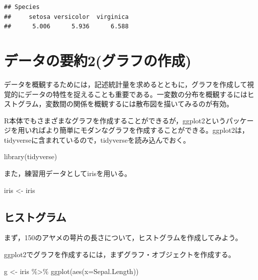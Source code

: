 \documentclass[
]{book}
\newenvironment{Shaded}{\begin{snugshade}}{\end{snugshade}}
\newcommand{\AttributeTok}[1]{\textcolor[rgb]{0.77,0.63,0.00}{#1}}
\newcommand{\FunctionTok}[1]{\textcolor[rgb]{0.00,0.00,0.00}{#1}}
\newcommand{\NormalTok}[1]{#1}
\newcommand{\OtherTok}[1]{\textcolor[rgb]{0.56,0.35,0.01}{#1}}
\newcommand{\SpecialCharTok}[1]{\textcolor[rgb]{0.00,0.00,0.00}{#1}}
\begin{document}
\begin{verbatim}
## Species
##     setosa versicolor  virginica 
##      5.006      5.936      6.588
\end{verbatim}

\hypertarget{ux30c7ux30fcux30bfux306eux8981ux7d042ux30b0ux30e9ux30d5ux306eux4f5cux6210}{%
\chapter{データの要約2(グラフの作成)}\label{ux30c7ux30fcux30bfux306eux8981ux7d042ux30b0ux30e9ux30d5ux306eux4f5cux6210}}

データを概観するためには，記述統計量を求めるとともに，グラフを作成して視覚的にデータの特性を捉えることも重要である。一変数の分布を概観するにはヒストグラム，変数間の関係を概観するには散布図を描いてみるのが有効。

R本体でもさまざまなグラフを作成することができるが，ggplot2というパッケージを用いればより簡単にモダンなグラフを作成することができる。ggplot2は，tidyverseに含まれているので，tidyverseを読み込んでおく。

\begin{Shaded}
\begin{Highlighting}[]
\FunctionTok{library}\NormalTok{(tidyverse)}
\end{Highlighting}
\end{Shaded}

また，練習用データとしてirisを用いる。

\begin{Shaded}
\begin{Highlighting}[]
\NormalTok{iris }\OtherTok{\textless{}{-}}\NormalTok{ iris}
\end{Highlighting}
\end{Shaded}

\hypertarget{ux30d2ux30b9ux30c8ux30b0ux30e9ux30e0}{%
\section{ヒストグラム}\label{ux30d2ux30b9ux30c8ux30b0ux30e9ux30e0}}

まず，150のアヤメの萼片の長さについて，ヒストグラムを作成してみよう。

ggplot2でグラフを作成するには，まずグラフ・オブジェクトを作成する。

\begin{Shaded}
\begin{Highlighting}[]
\NormalTok{g }\OtherTok{\textless{}{-}}\NormalTok{ iris }\SpecialCharTok{\%\textgreater{}\%} 
  \FunctionTok{ggplot}\NormalTok{(}\FunctionTok{aes}\NormalTok{(}\AttributeTok{x=}\NormalTok{Sepal.Length))}
\end{Highlighting}
\end{Shaded}
\end{document}
